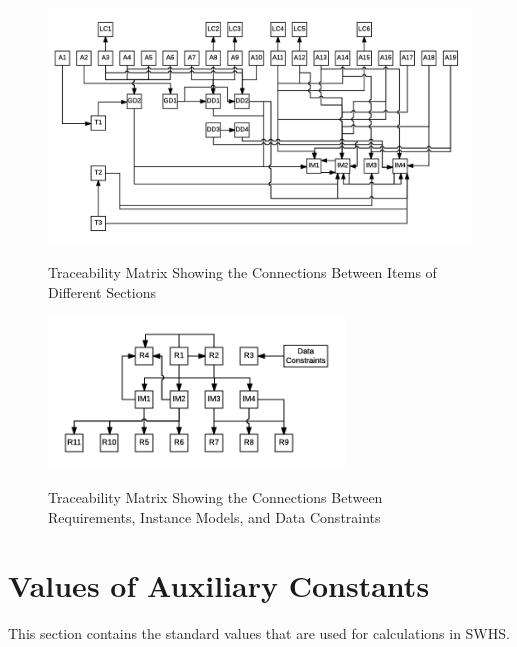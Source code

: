 \documentclass[12pt]{article}
\begin{document}
\begin{figure}[h!]
	\begin{center}
		{
			\includegraphics[width=\textwidth]{ATrace.png}
		}
		\caption{\label{Fig_ATrace} Traceability Matrix Showing the Connections Between Items of Different Sections}
	\end{center}
\end{figure}


\begin{figure}[h!]
	\begin{center}
		{
			\includegraphics[width=0.7\textwidth]{RTrace.png}
		}
		\caption{\label{Fig_RTrace} Traceability Matrix Showing the Connections Between Requirements, Instance Models, and Data Constraints}
	\end{center}
\end{figure}

\newpage

\section{Values of Auxiliary Constants} \label{Sec:ValuofAuxiCons}

This section contains the standard values that are used for calculations in
SWHS.\\
\end{document}
